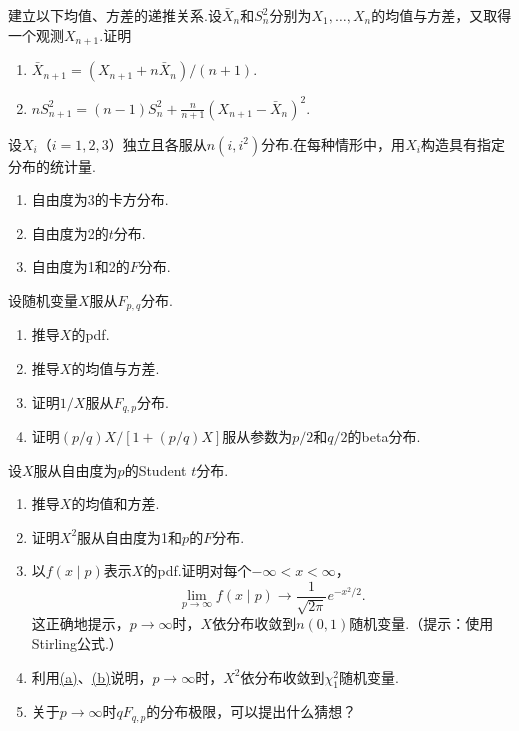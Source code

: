 \begin{exercise}\label{exercise:5.15}
建立以下均值、方差的递推关系.设$\bar X_n$和$S_n^2$分别为$X_1,\ldots,X_n$的均值与方差，又取得一个观测$X_{n+1}$.证明
\begin{enumerate}[label=(\alph*)]
\item $\bar X_{n+1}=(X_{n+1}+n\bar X_n)/(n+1)$.
\item $nS_{n+1}^2=(n-1)S_n^2+\frac n{n+1}(X_{n+1}-\bar X_n)^2$.
\end{enumerate}
\end{exercise}
\begin{exercise}\label{exercise:5.16}
设$X_i$（$i=1,2,3$）独立且各服从$n(i,i^2)$分布.在每种情形中，用$X_i$构造具有指定分布的统计量.
\begin{enumerate}[label=(\alph*)]\item 自由度为3的卡方分布.\item 自由度为2的$t$分布.\item 自由度为1和2的$F$分布.\end{enumerate}
\end{exercise}
\begin{exercise}\label{exercise:5.17}
设随机变量$X$服从$F_{p,q}$分布.
\begin{enumerate}[label=(\alph*)]\item 推导$X$的pdf.\item 推导$X$的均值与方差.\item 证明$1/X$服从$F_{q,p}$分布.\item 证明$(p/q)X/[1+(p/q)X]$服从参数为$p/2$和$q/2$的beta分布.\end{enumerate}
\end{exercise}
\begin{exercise}\label{exercise:5.18}
设$X$服从自由度为$p$的Student $t$分布.
\begin{enumerate}[label=(\alph*)]
\item{}\label{itm:exercise:5.18:a} 推导$X$的均值和方差.
\item{}\label{itm:exercise:5.18:b} 证明$X^2$服从自由度为1和$p$的$F$分布.
\item 以$f(x\mid p)$表示$X$的pdf.证明对每个$-\infty<x<\infty$，
$$\lim_{p\to\infty}f(x\mid p)\to\frac1{\sqrt{2\pi}}e^{-x^2/2}.$$
这正确地提示，$p\to\infty$时，$X$依分布收敛到$n(0,1)$随机变量.（提示：使用Stirling公式.）
\item 利用\hyperref[itm:exercise:5.18:a]{(a)}、\hyperref[itm:exercise:5.18:b]{(b)}说明，$p\to\infty$时，$X^2$依分布收敛到$\chi_1^2$随机变量.
\item 关于$p\to\infty$时$qF_{q,p}$的分布极限，可以提出什么猜想？
\end{enumerate}
\end{exercise}

